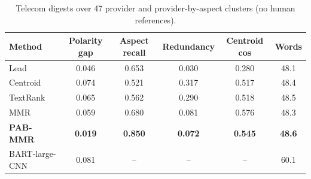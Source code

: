 \begin{table}[H]
\centering
\footnotesize
\caption{Telecom digests over 47 provider and provider-by-aspect clusters (no human references).}
\label{tab:telecom}
\begin{tabular}{lccccc}
\toprule
Method & Polarity gap & Aspect recall & Redundancy & Centroid cos & Words \\
\midrule
Lead & 0.046 & 0.653 & 0.030 & 0.280 & 48.1 \\
Centroid & 0.074 & 0.521 & 0.317 & 0.517 & 48.4 \\
TextRank & 0.065 & 0.562 & 0.290 & 0.518 & 48.5 \\
MMR & 0.059 & 0.680 & 0.081 & 0.576 & 48.3 \\
\textbf{PAB-MMR} & \textbf{0.019} & \textbf{0.850} & \textbf{0.072} & \textbf{0.545} & \textbf{48.6} \\
BART-large-CNN & 0.081 & -- & -- & -- & 60.1 \\
\bottomrule
\end{tabular}
\end{table}